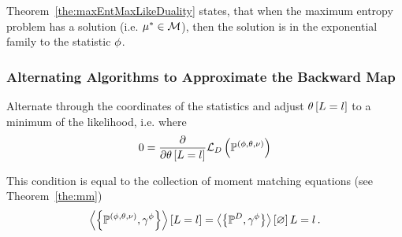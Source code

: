 %
Theorem~\ref{the:maxEntMaxLikeDuality} states, that when the maximum entropy problem has a solution (i.e. $\mu^*\in\mathcal{M}$), then the solution is in the exponential family to the statistic $\phi$.


\subsubsection{Alternating Algorithms to Approximate the Backward Map}\label{sec:alternatingBackwardMap}




Alternate through the coordinates of the statistics and adjust $\theta\left[L=l\right]$ to a minimum of the likelihood, i.e. where
\begin{align*}
	0 = \frac{\partial}{\partial \theta\left[L=l\right]} \mathcal{L}_{D}\left(\mathbb{P}^{(\phi,\theta,\nu)}\right)
\end{align*}

This condition is equal to the collection of moment matching equations (see Theorem~\ref{the:mm})
\begin{align*}
	\left\langle \left\{\mathbb{P}^{(\phi,\theta,\nu)},\gamma^{\phi}\right\}\right\rangle \left[ L=l \right] = \left\langle \left\{\mathbb{P}^{D},\gamma^{\phi}\right\}\right\rangle \left[ \varnothing \right]{L=l} \, . 
\end{align*}


